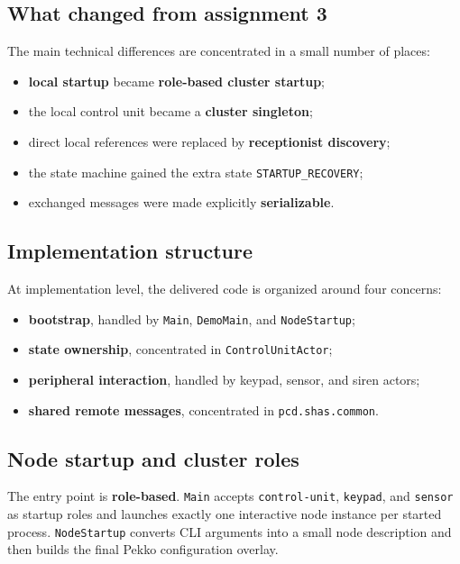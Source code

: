 \subsection{What changed from assignment 3}

The main technical differences are concentrated in a small number of places:
\begin{itemize}
    \item \textbf{local startup} became \textbf{role-based cluster startup};
    \item the local control unit became a \textbf{cluster singleton};
    \item direct local references were replaced by \textbf{receptionist discovery};
    \item the state machine gained the extra state \texttt{STARTUP\_RECOVERY};
    \item exchanged messages were made explicitly \textbf{serializable}.
\end{itemize}

\subsection{Implementation structure}

At implementation level, the delivered code is organized around four concerns:
\begin{itemize}
    \item \textbf{bootstrap}, handled by \texttt{Main}, \texttt{DemoMain}, and \texttt{NodeStartup};
    \item \textbf{state ownership}, concentrated in \texttt{ControlUnitActor};
    \item \textbf{peripheral interaction}, handled by keypad, sensor, and siren actors;
    \item \textbf{shared remote messages}, concentrated in \texttt{pcd.shas.common}.
\end{itemize}

\subsection{Node startup and cluster roles}

The entry point is \textbf{role-based}. \texttt{Main} accepts \texttt{control-unit},
\texttt{keypad}, and \texttt{sensor} as startup roles and launches exactly one
interactive node instance per started process. \texttt{NodeStartup} converts CLI arguments into a
small node description and then builds the final Pekko configuration overlay.

